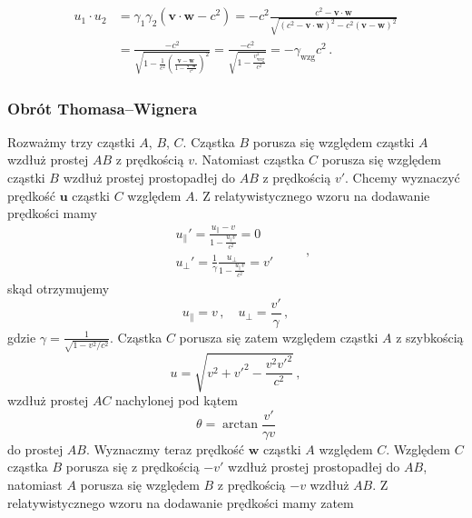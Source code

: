 \documentclass[../main.tex]{subfiles}
\begin{document}
\begin{equation*}
\begin{split}
    u_1\cdot u_2&=\gamma_1\gamma_2\left(\mathbf{v}\cdot\mathbf{w}-c^2\right)=-c^2\frac{c^2-\mathbf{v}\cdot\mathbf{w}}{\sqrt{(c^2-\mathbf{v}\cdot\mathbf{w})^2-c^2(\mathbf{v}-\mathbf{w})^2}}\\
    &=\frac{-c^2}{\sqrt{1-\frac{1}{c^2}\left(\frac{\mathbf{v}-\mathbf{w}}{1-\frac{\mathbf{v}\cdot\mathbf{w}}{c^2}}\right)^2}}=\frac{-c^2}{\sqrt{1-\frac{v^2_\text{wzg}}{c^2}}}=-\gamma_\text{wzg}c^2\,.
\end{split}
\end{equation*}
\subsubsection{Obrót Thomasa--Wignera}
Rozważmy trzy cząstki \(A\), \(B\), \(C\). Cząstka \(B\) porusza się względem cząstki \(A\) wzdłuż prostej \(AB\) z prędkością \(v\). Natomiast cząstka \(C\) porusza się względem cząstki \(B\) wzdłuż prostej prostopadłej do \(AB\) z prędkością \(v'\). Chcemy wyznaczyć prędkość \(\mathbf{u}\) cząstki \(C\) względem \(A\). Z relatywistycznego wzoru na dodawanie prędkości mamy
\begin{equation*}
\begin{split}
    &u_\parallel'=\frac{u_\parallel-v}{1-\frac{u_\parallel v}{c^2}}=0\\
    &u_\perp '=\frac{1}{\gamma}\frac{u_\perp}{1-\frac{u_\parallel v}{c^2}}=v'
\end{split}\quad\quad\,,
\end{equation*}
skąd otrzymujemy
\begin{equation*}
    u_\parallel=v\,,\quad u_\perp=\frac{v'}{\gamma}\,,
\end{equation*}
gdzie \(\gamma=\frac{1}{\sqrt{1-v^2/c^2}}\). Cząstka \(C\) porusza się zatem względem cząstki \(A\) z szybkością
\begin{equation*}
    u=\sqrt{v^2+v'^2-\frac{v^2v'^2}{c^2}}\,,
\end{equation*}
wzdłuż prostej \(AC\) nachylonej pod kątem
\begin{equation*}
    \theta=\arctan\frac{v'}{\gamma v}
\end{equation*}
do prostej \(AB\). Wyznaczmy teraz prędkość \(\mathbf{w}\) cząstki \(A\) względem \(C\). Względem \(C\) cząstka \(B\) porusza się z prędkością \(-v'\) wzdłuż prostej prostopadłej do \(AB\), natomiast \(A\) porusza się względem \(B\) z prędkością \(-v\) wzdłuż \(AB\). Z relatywistycznego wzoru na dodawanie prędkości mamy zatem
\end{document}

